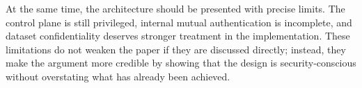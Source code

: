 \documentclass[sigconf,nonacm]{acmart}
\begin{document}
At the same time, the architecture should be presented with precise limits. The control plane is still privileged, internal mutual authentication is incomplete, and dataset confidentiality deserves stronger treatment in the implementation. These limitations do not weaken the paper if they are discussed directly; instead, they make the argument more credible by showing that the design is security-conscious without overstating what has already been achieved.



\end{document}
